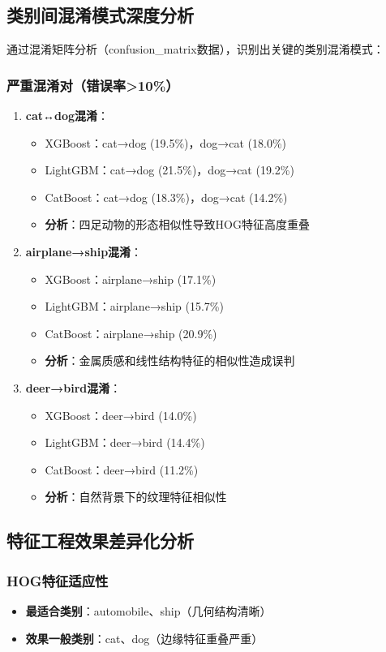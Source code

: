 \documentclass[UTF8]{report}
\theoremstyle{MyLineTheoremStyle} %
\theoremstyle{MyBlockTheoremStyle} %
\theoremstyle{MySubsubsectionStyle} %
\begin{document}
\subsection{类别间混淆模式深度分析}
通过混淆矩阵分析（confusion\_matrix数据），识别出关键的类别混淆模式：
\subsubsection{严重混淆对（错误率>10\%）}
\begin{enumerate}
    \item \textbf{cat↔dog混淆}：
    \begin{itemize}
        \item XGBoost：cat→dog (19.5\%)，dog→cat (18.0\%)
        \item LightGBM：cat→dog (21.5\%)，dog→cat (19.2\%)
        \item CatBoost：cat→dog (18.3\%)，dog→cat (14.2\%)
        \item \textbf{分析}：四足动物的形态相似性导致HOG特征高度重叠
    \end{itemize}
    \item \textbf{airplane→ship混淆}：
    \begin{itemize}
        \item XGBoost：airplane→ship (17.1\%)
        \item LightGBM：airplane→ship (15.7\%)
        \item CatBoost：airplane→ship (20.9\%)
        \item \textbf{分析}：金属质感和线性结构特征的相似性造成误判
    \end{itemize}
    \item \textbf{deer→bird混淆}：
    \begin{itemize}
        \item XGBoost：deer→bird (14.0\%)
        \item LightGBM：deer→bird (14.4\%)
        \item CatBoost：deer→bird (11.2\%)
        \item \textbf{分析}：自然背景下的纹理特征相似性
    \end{itemize}
\end{enumerate}

\subsection{特征工程效果差异化分析}
\subsubsection{HOG特征适应性}
\begin{itemize}
    \item \textbf{最适合类别}：automobile、ship（几何结构清晰）
    \item \textbf{效果一般类别}：cat、dog（边缘特征重叠严重）
\end{itemize}
\end{document}
